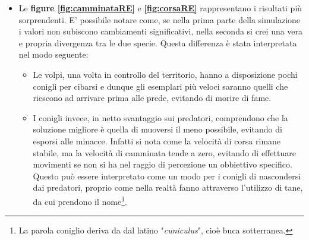 \documentclass[11pt]{article}
\begin{document}
\begin{itemize}


    \item Le \textbf{figure \ref{fig:camminataRE}} e \textbf{\ref{fig:corsaRE}} rappresentano i risultati più sorprendenti. E' possibile notare come, se nella prima parte della simulazione i valori non subiscono cambiamenti significativi, nella seconda si crei una vera e propria divergenza tra le due specie. Questa differenza è stata interpretata nel modo seguente:
    \begin{itemize}
        \item Le volpi, una volta in controllo del territorio, hanno a disposizione pochi conigli per cibarsi e dunque gli esemplari più veloci saranno quelli che riescono ad arrivare prima alle prede, evitando di morire di fame.
        \item I conigli invece, in netto svantaggio sui predatori, comprendono che la soluzione migliore è quella di muoversi il meno possibile, evitando di esporsi alle minacce. Infatti si nota come la velocità di corsa rimane stabile, ma la velocità di camminata tende a zero, evitando di effettuare movimenti se non si ha nel raggio di percezione un obbiettivo specifico. Questo può essere interpretato come un modo per i conigli di nascondersi dai predatori, proprio come nella realtà fanno attraverso l'utilizzo di tane, da cui prendono il nome\footnote{La parola coniglio deriva da dal latino "\textit{cuniculus}", cioè buca sotterranea.\cite{WikiConiglio} }. 
    \end{itemize}

\end{itemize}

\newpage
\end{document}
